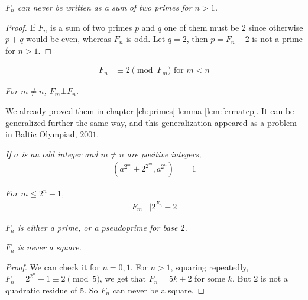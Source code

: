 \documentclass{subfile}
\begin{document}
		\begin{corollary}\slshape
			$F_n$ can never be written as a sum of two primes for $n>1$.
		\end{corollary}
		
		\begin{proof}
			If $F_n$ is a sum of two primes $p$ and $q$ one of them must be $2$ since otherwise $p+q$ would be even, whereas $F_n$ is odd. Let $q=2$, then $p=F_n-2$ is not a prime for $n>1$.
			
		\end{proof}
		
		\begin{corollary}\slshape
			\begin{align*}
				F_n & \equiv2\pmod{F_m}\text { for }m<n
			\end{align*}
		\end{corollary}
		
		\begin{theorem}\slshape
			For $m\neq n$, $F_m\bot F_n$.
		\end{theorem}
	We already proved them in chapter \eqref{ch:primes} lemma \eqref{lem:fermatcp}. It can be generalized further the same way, and this generalization appeared as a problem in Baltic Olympiad, $2001$.
		\begin{theorem}\slshape
			If $a$ is an odd integer and $m\neq n$ are positive integers,
				\begin{align*}
					\left(a^{2^m}+2^{2^m},a^{2^n}\right) & = 1
				\end{align*}
		\end{theorem}
		
		\begin{theorem}\slshape
			For $m\leq2^n-1$,
			\begin{align*}
			F_m & | 2^{F_{n}}-2
			\end{align*}
		\end{theorem}
		
		\begin{corollary}\slshape
			$F_n$ is either a prime, or a pseudoprime for base $2$.
		\end{corollary}
		
		\begin{theorem}\slshape
			$F_n$ is never a square.
		\end{theorem}
		
		\begin{proof}
			We can check it for $n=0,1$. For $n>1$, squaring repeatedly, $F_n=2^{2^n}+1\equiv2\pmod5$, we get that $F_n=5k+2$ for some $k$. But $2$ is not a quadratic residue of $5$. So $F_n$ can never be a square.
			
		\end{proof}
		
\end{document}
